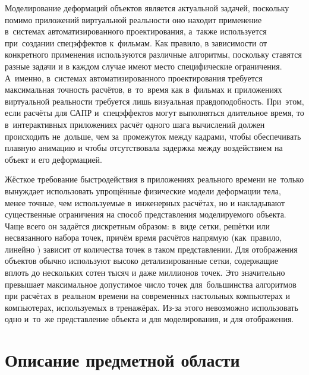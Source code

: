 \documentclass[a4paper, 14pt, titlepage]{extarticle}
\begin{document}
    Моделирование деформаций объектов является актуальной задачей, поскольку помимо приложений
    виртуальной реальности оно находит применение в~системах автоматизированного проектирования, а~также используется
    при~создании спецэффектов к~фильмам.  Как правило, в зависимости от конкретного применения
    используются различные алгоритмы, поскольку ставятся разные задачи и в каждом случае имеют место
    специфические ограничения. А~именно, в~системах автоматизированного проектирования требуется
    максимальная точность расчётов, в~то~время как в~фильмах и приложениях виртуальной реальности
    требуется лишь визуальная правдоподобность. При~этом, если расчёты для САПР и~спецэффектов могут
    выполняться длительное время, то в~интерактивных приложениях расчёт одного шага вычислений должен
    происходить не~дольше, чем за~промежуток между кадрами, чтобы обеспечивать плавную анимацию
    и чтобы отсутствовала задержка между воздействием на объект и его деформацией.

    Жёсткое требование быстродействия в приложениях реального времени не~только вынуждает
    использовать упрощённые физические модели деформации тела, менее точные, чем используемые
    в~инженерных расчётах, но и накладывают существенные ограничения на способ представления
    моделируемого объекта. Чаще всего он задаётся дискретным образом: в~виде сетки, решётки или
    несвязанного набора точек, причём время расчётов напрямую (как~правило, линейно
    \cite{mueller-meshless}) зависит от количества точек в таком представлении. Для отображения
    объектов обычно используют высоко детализированные сетки, содержащие вплоть до нескольких
    сотен тысяч и даже миллионов точек. Это значительно превышает максимальное допустимое число точек для~большинства
    алгоритмов \cite{mueller-stable, mueller-meshless, chang-crash} при расчётах в~реальном времени на
    современных настольных компьютерах и компьютерах, используемых в тренажёрах. Из-за этого
    невозможно использовать одно и~то~же представление объекта и для моделирования, и для
    отображения.

  \section{Описание предметной области}\label{sec:domain}
\end{document}
